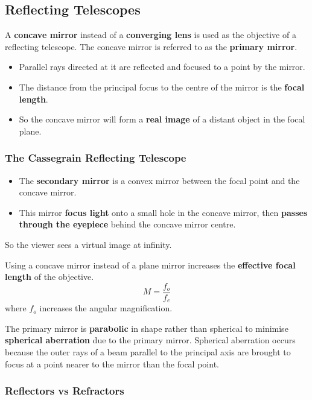\subsection{Reflecting Telescopes}

A \textbf{concave mirror} instead of a \textbf{converging lens} is used as the objective of a reflecting telescope. The concave mirror is referred to as the \textbf{primary mirror}.
\begin{itemize}
    \item Parallel rays directed at it are reflected and focused to a point by the mirror.
    \item The distance from the principal focus to the centre of the mirror is the \textbf{focal length}.
    \item So the concave mirror will form a \textbf{real image} of a distant object in the focal plane.
\end{itemize}

\subsubsection*{The Cassegrain Reflecting Telescope}

\begin{itemize}
    \item The \textbf{secondary mirror} is a convex mirror between the focal point and the concave mirror.
    \item This mirror \textbf{focus light} onto a small hole in the concave mirror, then \textbf{passes through the eyepiece} behind the concave mirror centre.
\end{itemize}

So the viewer sees a virtual image at infinity.

Using a concave mirror instead of a plane mirror increases the \textbf{effective focal length} of the objective.
$$M=\frac{f_o}{f_e}$$
where $f_o$ increases the angular magnification.

The primary mirror is \textbf{parabolic} in shape rather than spherical to minimise \textbf{spherical aberration} due to the primary mirror. Spherical aberration occurs because the outer rays of a beam parallel to the principal axis are brought to focus at a point nearer to the mirror than the focal point.

\subsubsection*{Reflectors vs Refractors}

